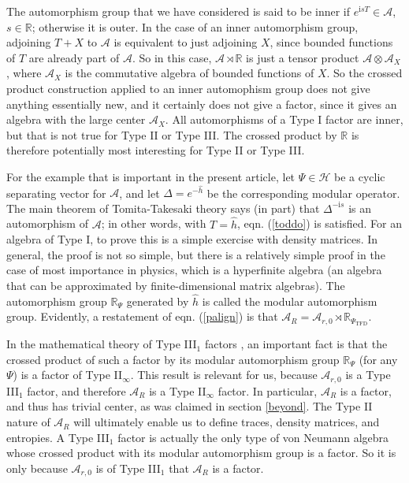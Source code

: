 \documentclass[11pt,a4paper]{article}
\def\i{{\mathrm i}}
\def\h{\widehat}
\def\A{{\mathcal A}}
\def\R{{\mathbb R}}
\def\h{\widehat}
\def\H{{\mathcal H}}
\def\TFD{{\mathrm{TFD}}}
\begin{document}
The automorphism group that we have considered is said to be inner if $e^{\i s T}\in \A$, $s\in\R$; otherwise it is outer.  
In the case of an inner automorphism group,  adjoining $T+X$ to $\A$ is equivalent to just adjoining $X$,  since bounded functions of $T$ are already part of $\A$.
So in this case,  $\A\rtimes \R$ is just a tensor product $\A\otimes \A_X$,
where $\A_X$ is the commutative algebra of bounded functions of $X$. So  the crossed product construction applied to an inner automophism
group does not give anything essentially new, and it certainly does not give a factor, since it gives an algebra with the large center $\A_X$.
  All automorphisms of a Type I factor are inner, but that is not true for Type II or Type III.   The crossed product by $\R$ is therefore 
  potentially most interesting for Type II or Type III.

For the example that is important in the present article, let  $\Psi\in\H $ be a cyclic separating vector for $\A$, and let $\Delta=e^{-\h h}$ be the 
corresponding modular operator.   The main theorem of Tomita-Takesaki theory says (in part) that $\Delta^{-\i s}$ is an automorphism of $\A$; in other words, with
$T=\h h$,
eqn. (\ref{toddo}) is satisfied.   For an algebra of Type I, to prove this is a simple exercise with density matrices.   In general, the proof is not so simple, but
there is a relatively simple proof \cite{Longo} in the case of most importance in physics, which is
a hyperfinite algebra (an algebra that can be approximated by  finite-dimensional matrix algebras).
The automorphism group $\R_\Psi$  generated by $\h h$ is  called the modular automorphism group.  
Evidently, a restatement of eqn. (\ref{palign}) 
 is that $\A_R=\A_{r,0}\rtimes \R_{\Psi_\TFD}$.   
 
 In the mathematical theory of Type III$_1$ factors  \cite{Takesaki,Connes,ConnesBook},
 an important fact is that the crossed product of such a factor by its modular automorphism
 group $\R_\Psi$ (for any $\Psi$) is a factor of Type II$_\infty$.  This result is relevant for us, because $\A_{r,0}$ is a  Type III$_1$ factor,
 and therefore $\A_R$ is a Type II$_\infty$ factor.    In particular, $\A_R$ is a factor, and thus has trivial center, as was claimed in section \ref{beyond}.
The Type II nature of $\A_R$ will ultimately enable us to define traces, density matrices, and entropies.    A Type III$_1$ factor is actually the only type of von
Neumann algebra whose crossed product with its modular automorphism group is a factor.   So it is only because $\A_{r,0}$ is of Type III$_1$ that $\A_R$ is
a factor.
 
\end{document}
